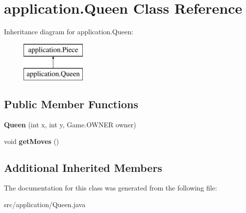 \hypertarget{classapplication_1_1_queen}{\section{application.\+Queen Class Reference}
\label{classapplication_1_1_queen}
}
Inheritance diagram for application.\+Queen\+:\begin{figure}[H]
\begin{center}
\leavevmode
\includegraphics[height=2.000000cm]{classapplication_1_1_queen}
\end{center}
\end{figure}
\subsection*{Public Member Functions}
\begin{DoxyCompactItemize}
\item 
\hypertarget{classapplication_1_1_queen_a72921fc90666a1931a1e058d0ab63e85}{{\bfseries Queen} (int x, int y, Game.\+O\+W\+N\+E\+R owner)}\label{classapplication_1_1_queen_a72921fc90666a1931a1e058d0ab63e85}

\item 
\hypertarget{classapplication_1_1_queen_ab020c2fde4eeb0f6d5e6020434d90b1f}{void {\bfseries get\+Moves} ()}\label{classapplication_1_1_queen_ab020c2fde4eeb0f6d5e6020434d90b1f}

\end{DoxyCompactItemize}
\subsection*{Additional Inherited Members}


The documentation for this class was generated from the following file\+:\begin{DoxyCompactItemize}
\item 
src/application/Queen.\+java\end{DoxyCompactItemize}
